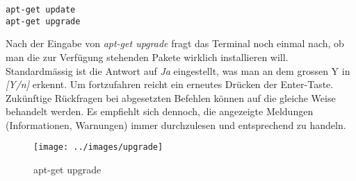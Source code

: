 \begin{lstlisting}
apt-get update
apt-get upgrade
\end{lstlisting}

Nach der Eingabe von \textit{apt-get upgrade} fragt das Terminal noch einmal nach, ob man die zur Verfügung stehenden Pakete wirklich installieren will. Standardmässig ist die Antwort auf \textit{Ja} eingestellt, was man an dem grossen Y in \textit{[Y/n]} erkennt. Um fortzufahren reicht ein erneutes Drücken der Enter-Taste. Zukünftige Rückfragen bei abgesetzten Befehlen können auf die gleiche Weise behandelt werden. Es empfiehlt sich dennoch, die angezeigte Meldungen (Informationen, Warnungen) immer durchzulesen und entsprechend zu handeln.

\begin{figure}[h]
\centering
\texttt{[image: ../images/upgrade]}
\caption{apt-get upgrade}
\end{figure}
